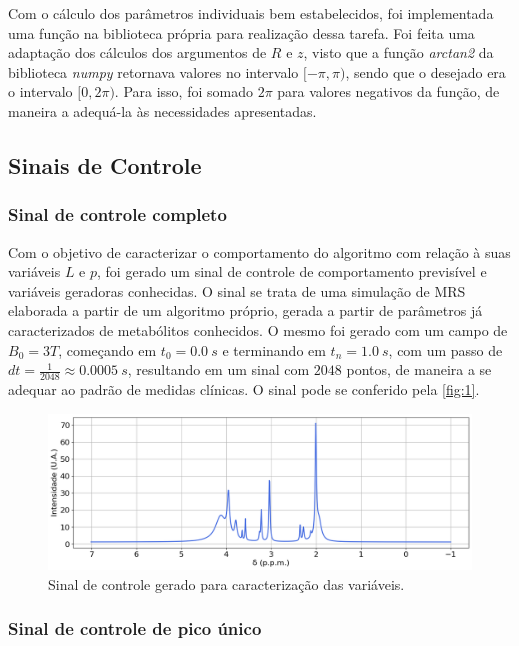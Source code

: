\documentclass[12pt]{article}
\begin{document}
Com o cálculo dos parâmetros individuais bem estabelecidos, foi implementada uma função na biblioteca própria para realização dessa tarefa. Foi feita uma 
adaptação dos cálculos dos argumentos de $R$ e $z$, visto que a função \textit{arctan2} da biblioteca \textit{numpy} retornava valores no intervalo $[-\pi, \pi)$, 
sendo que o desejado era o intervalo $[0, 2\pi)$. Para isso, foi somado $2\pi$ para valores negativos da função, de maneira a adequá-la às necessidades apresentadas. 

\subsection{Sinais de Controle}

\subsubsection{Sinal de controle completo} \label{sec:sinal-completo}

Com o objetivo de caracterizar o comportamento do algoritmo com relação à suas variáveis $L$ e $p$, foi gerado um sinal de controle 
de comportamento previsível e variáveis geradoras conhecidas. O sinal se trata de uma simulação de MRS elaborada a partir de um algoritmo 
próprio, gerada a partir de parâmetros já caracterizados de metabólitos conhecidos. O mesmo foi gerado com um campo de $B_0 = 3T$, começando em 
$t_0 = 0.0 \ s$ e terminando em $t_n = 1.0 \ s$, com um passo de $dt = \frac{1}{2048} \approx 0.0005 \ s$, resultando em um sinal com $2048$ pontos, de maneira 
a se adequar ao padrão de medidas clínicas. O sinal pode se conferido pela \autoref{fig:1}.

\begin{figure} [H]
    \includegraphics[scale=0.5]{sinal-de-controle.png}
    \centering
    \caption{Sinal de controle gerado para caracterização das variáveis.}
    \label{fig:1}
\end{figure}

\subsubsection{Sinal de controle de pico único}
\end{document}
